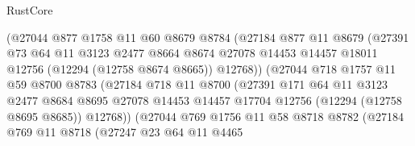 \begin{lexlean}{RustCore}
\begin{coremodule}
                          (@27044
                            @877
                            @1758
                            @11
                            @60
                            @8679
                            @8784
                            (@27184
                              @877
                              @11
                              @8679
                              (@27391
                                @73
                                @64
                                @11
                                @3123
                                @2477
                                @8664
                                @8674
                                @27078
                                @14453
                                @14457
                                @18011
                                @12756
                                (@12294 (@12758 @8674 @8665))
                                @12768))
                            (@27044
                              @718
                              @1757
                              @11
                              @59
                              @8700
                              @8783
                              (@27184
                                @718
                                @11
                                @8700
                                (@27391
                                  @171
                                  @64
                                  @11
                                  @3123
                                  @2477
                                  @8684
                                  @8695
                                  @27078
                                  @14453
                                  @14457
                                  @17704
                                  @12756
                                  (@12294 (@12758 @8695 @8685))
                                  @12768))
                              (@27044
                                @769
                                @1756
                                @11
                                @58
                                @8718
                                @8782
                                (@27184
                                  @769
                                  @11
                                  @8718
                                  (@27247
                                    @23
                                    @64
                                    @11
                                    @4465

\end{coremodule}
\end{lexlean}
